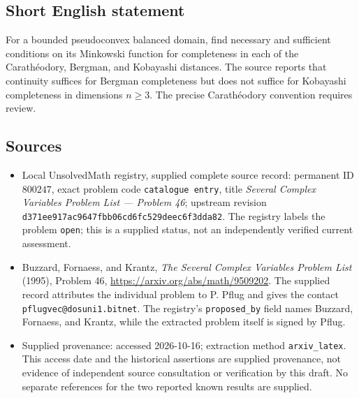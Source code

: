 \documentclass[11pt]{article}
\begin{document}
\subsection{Short English statement}
For a bounded pseudoconvex balanced domain, find necessary and sufficient conditions on its Minkowski function for completeness in each of the Carath\'eodory, Bergman, and Kobayashi distances. The source reports that continuity suffices for Bergman completeness but does not suffice for Kobayashi completeness in dimensions \(n\geq 3\). The precise Carath\'eodory convention requires review.
\subsection{Sources}
\begin{itemize}
\item Local UnsolvedMath registry, supplied complete source record: permanent ID \(800247\), exact problem code \texttt{catalogue entry}, title \emph{Several Complex Variables Problem List --- Problem 46}; upstream revision \texttt{d371ee917ac9647fbb06cd6fc529deec6f3dda82}. The registry labels the problem \texttt{open}; this is a supplied status, not an independently verified current assessment.
\item Buzzard, Fornaess, and Krantz, \emph{The Several Complex Variables Problem List} (1995), Problem 46, \url{https://arxiv.org/abs/math/9509202}. The supplied record attributes the individual problem to P. Pflug and gives the contact \texttt{pflugvec@dosuni1.bitnet}. The registry's \texttt{proposed\_by} field names Buzzard, Fornaess, and Krantz, while the extracted problem itself is signed by Pflug.
\item Supplied provenance: accessed 2026-10-16; extraction method \texttt{arxiv\_latex}. This access date and the historical assertions are supplied provenance, not evidence of independent source consultation or verification by this draft. No separate references for the two reported known results are supplied.
\end{itemize}
\end{document}
